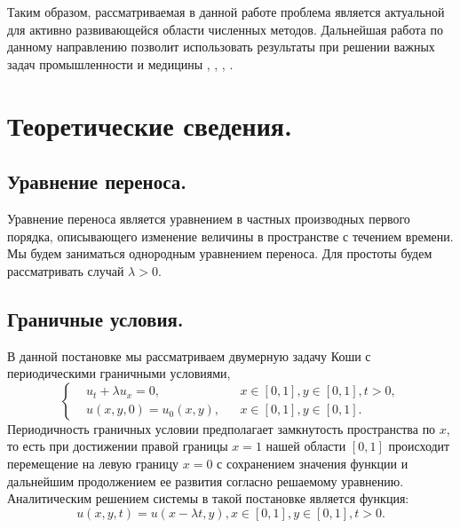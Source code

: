 \documentclass[14pt]{article}
\begin{document}
Таким образом, рассматриваемая в данной работе проблема является актуальной для активно развивающейся области численных методов. 
Дальнейшая работа по данному направлению позволит использовать результаты при решении важных задач промышленности и медицины \cite{16}, \cite{17}, \cite{18}, \cite{19}. 

\newpage
\section{Теоретические сведения.}
\subsection{Уравнение переноса.}
Уравнение переноса является уравнением в частных производных первого порядка, описывающего изменение величины в пространстве с течением времени. Мы будем заниматься однородным уравнением переноса. Для простоты будем рассматривать случай $\lambda>0$.
\subsection{Граничные условия.}
В данной постановке мы рассматриваем двумерную задачу Коши с периодическими граничными условиями,
\begin{equation}
 \left\lbrace
  \begin{aligned}
    &u_{t} + \lambda u_{x} = 0,  &&x \in [0,1],y \in [0,1], t>0,\\
    &u(x,y,0) = u_0 (x,y), &&x \in [0,1], y \in [0,1].
  \end{aligned} \right.
\end{equation} 
Периодичность граничных условии предполагает замкнутость  пространства по $x$, то есть при достижении правой границы $x = 1$ нашей области $[0, 1]$ происходит перемещение на левую границу $x = 0$ с сохранением значения функции и дальнейшим продолжением ее развития согласно решаемому уравнению. 
Аналитическим решением системы в такой постановке является функция:
\begin{equation}
u(x,y,t) = u(x-\lambda t,y), x \in [0,1], y \in [0,1], t>0.
\end{equation}
\end{document}
